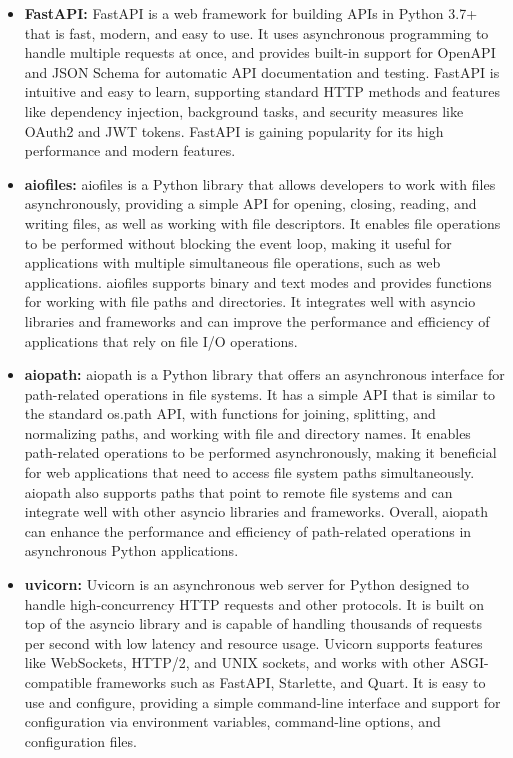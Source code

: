 \documentclass[sigconf]{acmart}
\begin{document}
\begin{itemize}
\item{\textbf{FastAPI: }
FastAPI is a web framework for building APIs in Python 3.7+ that is fast, modern, and easy to use. It uses asynchronous programming to handle multiple requests at once, and provides built-in support for OpenAPI and JSON Schema for automatic API documentation and testing. FastAPI is intuitive and easy to learn, supporting standard HTTP methods and features like dependency injection, background tasks, and security measures like OAuth2 and JWT tokens. FastAPI is gaining popularity for its high performance and modern features.}
\item{\textbf{aiofiles: }
aiofiles is a Python library that allows developers to work with files asynchronously, providing a simple API for opening, closing, reading, and writing files, as well as working with file descriptors. It enables file operations to be performed without blocking the event loop, making it useful for applications with multiple simultaneous file operations, such as web applications. aiofiles supports binary and text modes and provides functions for working with file paths and directories. It integrates well with asyncio libraries and frameworks and can improve the performance and efficiency of applications that rely on file I/O operations.}
\item{\textbf{aiopath: }
aiopath is a Python library that offers an asynchronous interface for path-related operations in file systems. It has a simple API that is similar to the standard os.path API, with functions for joining, splitting, and normalizing paths, and working with file and directory names. It enables path-related operations to be performed asynchronously, making it beneficial for web applications that need to access file system paths simultaneously. aiopath also supports paths that point to remote file systems and can integrate well with other asyncio libraries and frameworks. Overall, aiopath can enhance the performance and efficiency of path-related operations in asynchronous Python applications.}
\item{\textbf{uvicorn: }
Uvicorn is an asynchronous web server for Python designed to handle high-concurrency HTTP requests and other protocols. It is built on top of the asyncio library and is capable of handling thousands of requests per second with low latency and resource usage. Uvicorn supports features like WebSockets, HTTP/2, and UNIX sockets, and works with other ASGI-compatible frameworks such as FastAPI, Starlette, and Quart. It is easy to use and configure, providing a simple command-line interface and support for configuration via environment variables, command-line options, and configuration files.}

\end{itemize}
\end{document}
